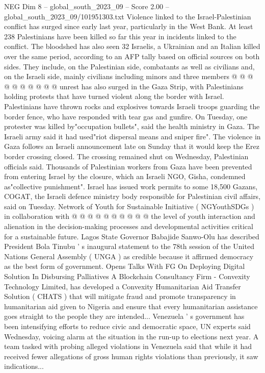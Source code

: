 \begin{textsample}{NEG Dim 8 – global\_south\_2023\_09 – Score 2.00 – global\_south\_2023\_09/101951303.txt}
Violence linked to the Israel-Palestinian conflict has surged since early last year, particularly in the West Bank.
At least 238 Palestinians have been killed so far this year in incidents linked to the conflict.
The bloodshed has also seen 32 Israelis, a Ukrainian and an Italian killed over the same period, according to an AFP tally based on official sources on both sides.
They include, on the Palestinian side, combatants as well as civilians and, on the Israeli side, mainly civilians including minors and three members @ @ @ @ @ @ @ @ @ @ unrest has also surged in the Gaza Strip, with Palestinians holding protests that have turned violent along the border with Israel.
Palestinians have thrown rocks and explosives towards Israeli troops guarding the border fence, who have responded with tear gas and gunfire.
On Tuesday, one protester was killed by"occupation bullets", said the health ministry in Gaza.
The Israeli army said it had used"riot dispersal means and sniper fire".
The violence in Gaza follows an Israeli announcement late on Sunday that it would keep the Erez border crossing closed.
The crossing remained shut on Wednesday, Palestinian officials said.
Thousands of Palestinian workers from Gaza have been prevented from entering Israel by the closure, which an Israeli NGO, Gisha, condemned as"collective punishment".
Israel has issued work permits to some 18,500 Gazans, COGAT, the Israeli defence ministry body responsible for Palestinian civil affairs, said on Tuesday.
Network of Youth for Sustainable Initiative ( NGYouthSDGs ) in collaboration with @ @ @ @ @ @ @ @ @ @ the level of youth interaction and alienation in the decision-making processes and developmental activities critical for a sustainable future.
Lagos State Governor Babajide Sanwo-Olu has described President Bola Tinubu ' s inaugural statement to the 78th session of the United Nations General Assembly ( UNGA ) as credible because it affirmed democracy as the best form of government.
Opens Talks With FG On Deploying Digital Solution In Disbursing Palliatives A Blockchain Consultancy Firm - Convexity Technology Limited, has developed a Convexity Humanitarian Aid Transfer Solution ( CHATS ) that will mitigate fraud and promote transparency in humanitarian aid given to Nigeria and ensure that every humanitarian assistance goes straight to the people they are intended...
Venezuela ' s government has been intensifying efforts to reduce civic and democratic space, UN experts said Wednesday, voicing alarm at the situation in the run-up to elections next year.
A team tasked with probing alleged violations in Venezuela said that while it had received fewer allegations of gross human rights violations than previously, it saw indications...

\end{textsample}
